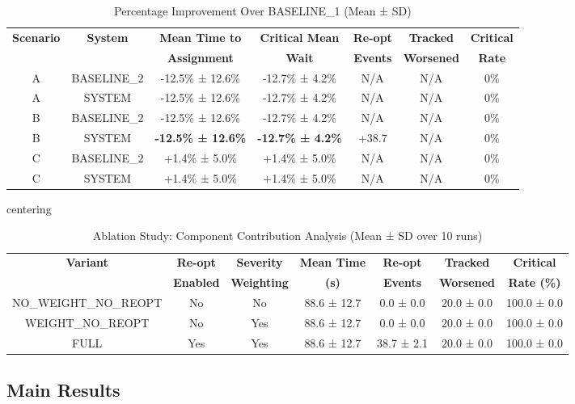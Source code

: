 \documentclass[conference]{IEEEtran}
\begin{document}
\begin{table}[t]
\caption{Percentage Improvement Over BASELINE\_1 (Mean ± SD)}
\label{tab:improvement}
\centering
\begin{tabular}{|c|c|c|c|c|c|c|}
\hline
\textbf{Scenario} & \textbf{System} & \textbf{Mean Time to} & \textbf{Critical Mean} & \textbf{Re-opt} & \textbf{Tracked} & \textbf{Critical} \\
& & \textbf{Assignment} & \textbf{Wait} & \textbf{Events} & \textbf{Worsened} & \textbf{Rate} \\
\hline
A & BASELINE\_2 & -12.5\% ± 12.6\% & -12.7\% ± 4.2\% & N/A & N/A & 0\% \\
A & SYSTEM & -12.5\% ± 12.6\% & -12.7\% ± 4.2\% & N/A & N/A & 0\% \\
\hline
B & BASELINE\_2 & -12.5\% ± 12.6\% & -12.7\% ± 4.2\% & N/A & N/A & 0\% \\
B & SYSTEM & \textbf{-12.5\% ± 12.6\%} & \textbf{-12.7\% ± 4.2\%} & +38.7 & N/A & 0\% \\
\hline
C & BASELINE\_2 & +1.4\% ± 5.0\% & +1.4\% ± 5.0\% & N/A & N/A & 0\% \\
C & SYSTEM & +1.4\% ± 5.0\% & +1.4\% ± 5.0\% & N/A & N/A & 0\% \\
\hline
\end{tabular}
\end{table}

\begin{table}[t]
\caption{Ablation Study: Component Contribution Analysis (Mean ± SD over 10 runs)}
\label{tab:ablation}
centering
\begin{tabular}{|c|c|c|c|c|c|c|}
\hline
\textbf{Variant} & \textbf{Re-opt} & \textbf{Severity} & \textbf{Mean Time} & \textbf{Re-opt} & \textbf{Tracked} & \textbf{Critical} \\
& \textbf{Enabled} & \textbf{Weighting} & \textbf{(s)} & \textbf{Events} & \textbf{Worsened} & \textbf{Rate (\%)} \\
\hline
NO\_WEIGHT\_NO\_REOPT & No & No & 88.6 ± 12.7 & 0.0 ± 0.0 & 20.0 ± 0.0 & 100.0 ± 0.0 \\
WEIGHT\_NO\_REOPT & No & Yes & 88.6 ± 12.7 & 0.0 ± 0.0 & 20.0 ± 0.0 & 100.0 ± 0.0 \\
FULL & Yes & Yes & 88.6 ± 12.7 & 38.7 ± 2.1 & 20.0 ± 0.0 & 100.0 ± 0.0 \\
\hline
\end{tabular}
\end{table}

\subsection{Main Results}
\end{document}
